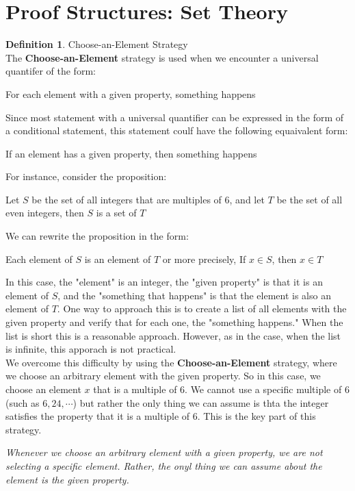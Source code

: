 \documentclass{book}
\theoremstyle{definition}
\newtheorem{definition}{Definition}[section]
\theoremstyle{remark}
\begin{document}
\newpage
\section{Proof Structures: Set Theory}

\begin{definition}
Choose-an-Element Strategy \\

    The \textbf{Choose-an-Element} strategy is used when we encounter a universal quantifer of the form: 
        \begin{center}
            For each element with a given property, something happens
        \end{center}
    Since most statement with a universal quantifier can be expressed in the form of a conditional statement, this statement coulf have the following equaivalent form: 
        \begin{center}
            If an element has a given property, then something happens
        \end{center}
    For instance, consider the proposition:
        \begin{center}
            Let $S$ be the set of all integers that are multiples of $6$, and let $T$ be the set of all even integers, then $S$ is a set of $T$
        \end{center}
    We can rewrite the proposition in the form:
        \begin{center}
            Each element of $S$ is an element of $T$ or more precisely, If $x \in S$, then $x \in T$
        \end{center}
    
    In this case, the "element" is an integer, the "given property" is that it is an element of $S$, and the "something that happens" is that the element is also an element of $T$. One way to approach this is to create a list of all elements with the given property and verify that for each one, the "something happens." When the list is short this is a reasonable approach. However, as in the case, when the list is infinite, this apporach is not practical. \\
    
    We overcome this difficulty by using the \textbf{Choose-an-Element} strategy, where we choose an arbitrary element with the given property. So in this case, we choose an element $x$ that is a multiple of $6$. We cannot use a specific multiple of $6$ (such as $6, 24, \cdots$) but rather the only thing we can assume is thta the integer satisfies the property that it is a multiple of $6$. This is the key part of this strategy.
        \begin{center}
            \textit{Whenever we choose an arbitrary element with a given property, we are not selecting a specific element. Rather, the onyl thing we can assume about the element is the given property.}
        \end{center}
    

\end{definition}
\end{document}
